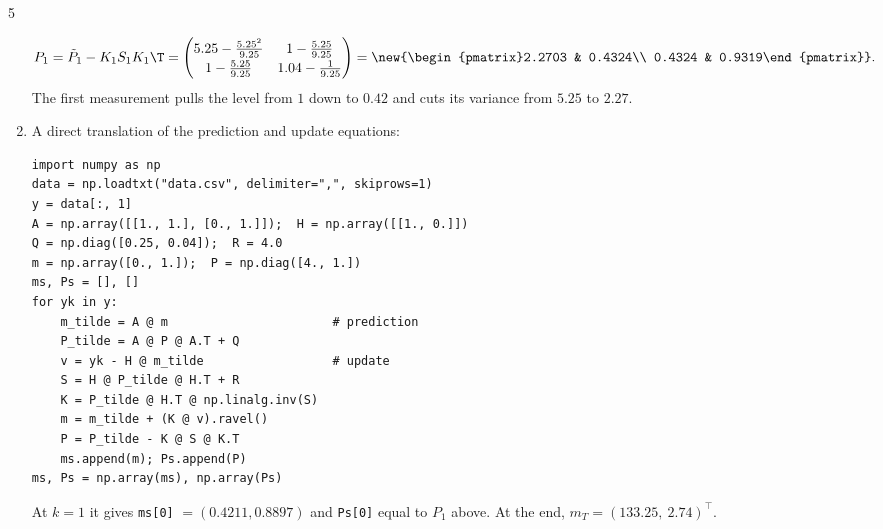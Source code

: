 \begin{homework}{5}
\begin{enumerate}[label=(\arabic*)]
\begin{align*}
P_1 &= \Pt_1 - K_1S_1K_1\T = \begin{pmatrix}5.25 - \frac{5.25^2}{9.25} & 1 - \frac{5.25}{9.25}\\[2pt] 1 - \frac{5.25}{9.25} & 1.04 - \frac{1}{9.25}\end{pmatrix} = \new{\begin{pmatrix}2.2703 & 0.4324\\ 0.4324 & 0.9319\end{pmatrix}}.
\end{align*}
The first measurement pulls the level from $1$ down to $0.42$ and cuts its variance from $5.25$ to $2.27$.

\item A direct translation of the prediction and update equations:
\begin{small}
\begin{verbatim}
import numpy as np
data = np.loadtxt("data.csv", delimiter=",", skiprows=1)
y = data[:, 1]
A = np.array([[1., 1.], [0., 1.]]);  H = np.array([[1., 0.]])
Q = np.diag([0.25, 0.04]);  R = 4.0
m = np.array([0., 1.]);  P = np.diag([4., 1.])
ms, Ps = [], []
for yk in y:
    m_tilde = A @ m                       # prediction
    P_tilde = A @ P @ A.T + Q
    v = yk - H @ m_tilde                  # update
    S = H @ P_tilde @ H.T + R
    K = P_tilde @ H.T @ np.linalg.inv(S)
    m = m_tilde + (K @ v).ravel()
    P = P_tilde - K @ S @ K.T
    ms.append(m); Ps.append(P)
ms, Ps = np.array(ms), np.array(Ps)
\end{verbatim}
\end{small}
At $k = 1$ it gives \texttt{ms[0]} $= (0.4211, 0.8897)$ and \texttt{Ps[0]} equal to $P_1$ above. At the end, $m_T = (133.25,\ 2.74)^\top$.


\end{enumerate}
\end{homework}
